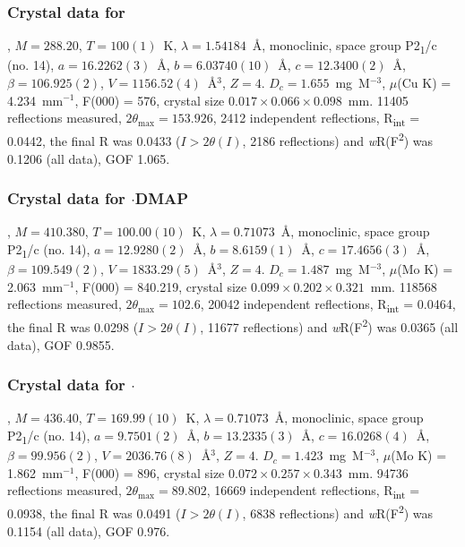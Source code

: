 \begin{refsection}
\subsubsection{Crystal data for \texorpdfstring{}{C14 H11 N O Se}}
, $M=288.20$, $T=100(1)$~K, $\lambda=1.54184$~\AA, monoclinic, space group P2\textsubscript{1}/c (no. 14), $a = 16.2262(3)$~\AA, $b = 6.03740(10)$~\AA, $c = 12.3400(2)$~\AA, $\beta = 106.925(2)$\degree, $V = 1156.52(4)$~\AA$^{3}$, $Z = 4$. $D_{c}= 1.655$~mg~M$^{-3}$, $\mu$(Cu K\a) = 4.234~mm$^{-1}$, F(000) = 576, crystal size $0.017 \times 0.066 \times 0.098$~mm. 11405 reflections measured, $2\theta_{\mathrm{max}}=153.926$\degree, 2412 independent reflections, R\textsubscript{int} = 0.0442, the final R was 0.0433 ($I > 2\theta(I)$, 2186 reflections) and \emph{w}R(F\textsuperscript{2}) was 0.1206 (all data), GOF 1.065.

\subsubsection{Crystal data for \texorpdfstring{$\cdot$DMAP}{C21 H21 N3 O Se}}
, $M=410.380$, $T=100.00(10)$~K, $\lambda=0.71073$~\AA, monoclinic, space group P2\textsubscript{1}/c (no. 14), $a = 12.9280(2)$~\AA, $b = 8.6159(1)$~\AA, $c = 17.4656(3)$~\AA, $\beta = 109.549(2)$\degree, $V = 1833.29(5)$~\AA$^{3}$, $Z = 4$. $D_{c}= 1.487$~mg~M$^{-3}$, $\mu$(Mo K\a) = 2.063~mm$^{-1}$, F(000) = 840.219, crystal size $0.099 \times 0.202 \times 0.321$~mm. 118568 reflections measured, $2\theta_{\mathrm{max}}=102.6$\degree, 20042 independent reflections, R\textsubscript{int} = 0.0464, the final R was 0.0298 ($I > 2\theta(I)$, 11677 reflections) and \emph{w}R(F\textsuperscript{2}) was 0.0365 (all data), GOF 0.9855.

\subsubsection{Crystal data for \texorpdfstring{$\cdot$}{C23 H23 N3 O Se}}
, $M=436.40$, $T=169.99(10)$~K, $\lambda=0.71073$~\AA, monoclinic, space group P2\textsubscript{1}/c (no. 14), $a = 9.7501(2)$~\AA, $b = 13.2335(3)$~\AA, $c = 16.0268(4)$~\AA, $\beta = 99.956(2)$\degree, $V = 2036.76(8)$~\AA$^{3}$, $Z = 4$. $D_{c}= 1.423$~mg~M$^{-3}$, $\mu$(Mo K\a) = 1.862~mm$^{-1}$, F(000) = 896, crystal size $0.072 \times 0.257 \times 0.343$~mm. 94736 reflections measured, $2\theta_{\mathrm{max}}=89.802$\degree, 16669 independent reflections, R\textsubscript{int} = 0.0938, the final R was 0.0491 ($I > 2\theta(I)$, 6838 reflections) and \emph{w}R(F\textsuperscript{2}) was 0.1154 (all data), GOF 0.976.


\end{refsection}
